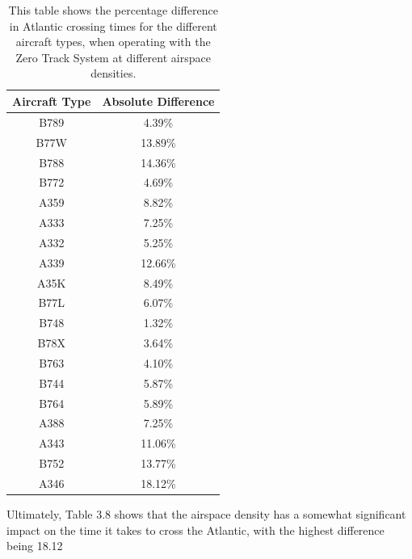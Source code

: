 \documentclass[stu, a4paper, 12pt, floatsintext]{apa7}
\numberwithin{figure}{section}
\numberwithin{table}{section}
\numberwithin{equation}{section}
\begin{document}
\begin{table}[H]
    \centering
    \caption{This table shows the percentage difference in Atlantic crossing times for the different aircraft types, when operating with the Zero Track System at different airspace densities.}
    \label{tab:38}
    \begin{tabular}{@{}cc@{}}
    \toprule
    \textbf{Aircraft Type} & \textbf{Absolute Difference} \\ \midrule
    B789                   & 4.39\%                       \\
    B77W                   & 13.89\%                      \\
    B788                   & 14.36\%                      \\
    B772                   & 4.69\%                       \\
    A359                   & 8.82\%                       \\
    A333                   & 7.25\%                       \\
    A332                   & 5.25\%                       \\
    A339                   & 12.66\%                      \\
    A35K                   & 8.49\%                       \\
    B77L                   & 6.07\%                       \\
    B748                   & 1.32\%                       \\
    B78X                   & 3.64\%                       \\
    B763                   & 4.10\%                       \\
    B744                   & 5.87\%                       \\
    B764                   & 5.89\%                       \\
    A388                   & 7.25\%                       \\
    A343                   & 11.06\%                      \\
    B752                   & 13.77\%                      \\
    A346                   & 18.12\%                      \\ \bottomrule
    \end{tabular}
\end{table}

Ultimately, Table 3.8 shows that the airspace density has a somewhat significant impact on the time it takes to cross the Atlantic, with the highest difference being 18.12%
\end{document}
